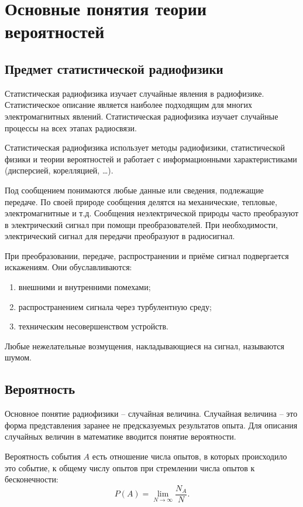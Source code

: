 \section{Основные понятия теории вероятностей}
\subsection{Предмет статистической радиофизики}

Статистическая радиофизика изучает случайные явления в радиофизике.
Статистическое описание является наиболее подходящим для многих электромагнитных
явлений. Статистическая радиофизика изучает случайные процессы на всех этапах
радиосвязи.

Статистическая радиофизика использует методы радиофизики, статистической физики
и теории вероятностей и работает с информационными характеристиками (дисперсией,
корелляцией, \ldots).

Под сообщением понимаются любые данные или сведения, подлежащие передаче. По
своей природе сообщения делятся на механические, тепловые, электромагнитные и
т.д. Сообщения неэлектрической природы часто преобразуют в электрический сигнал
при помощи преобразователей. При необходимости, электрический сигнал для
передачи преобразуют в радиосигнал.

При преобразовании, передаче, распространении и приёме сигнал подвергается
искажениям. Они обуславливаются:
\begin{enumerate}
    \item внешними и внутренними помехами;
    \item распространением сигнала через турбулентную среду;
    \item техническим несовершенством устройств.
\end{enumerate}
Любые нежелательные возмущения, накладывающиеся на сигнал, называются шумом.

\subsection{Вероятность}

Основное понятие радиофизики -- случайная величина. Случайная величина -- это
форма представления заранее не предсказуемых результатов опыта. Для описания
случайных величин в математике вводится понятие вероятности.

Вероятность события \( A \) есть отношение числа опытов, в которых происходило
это событие, к общему числу опытов при стремлении числа опытов к бесконечности:
\[
    P(A) = \lim_{N\to\infty}\frac{N_A}{N}.
\]

